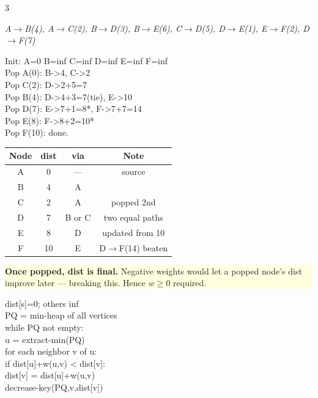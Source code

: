 \documentclass[9pt]{extarticle}
\newcommand{\yb}[1]{\vspace{1pt}\noindent\colorbox{lightyellow}{\parbox{\dimexpr\linewidth-2\fboxsep}{\footnotesize\sffamily #1}}\vspace{1pt}}
\newcommand{\cd}[1]{{\fontsize{7}{8.5}\selectfont\ttfamily\noindent #1}}
\begin{document}
\vspace{2pt}
\begin{multicols}{3}

\begin{tcolorbox}[teal,title=Dijkstra on Master Graph (source $A$)]
\small
\textit{A$\to$B(4), A$\to$C(2), B$\to$D(3), B$\to$E(6), C$\to$D(5), D$\to$E(1), E$\to$F(2), D$\to$F(7)}

\cd{Init: A=0 B=inf C=inf D=inf E=inf F=inf\\
Pop A(0): B->4, C->2\\
Pop C(2): D->2+5=7\\
Pop B(4): D->4+3=7(tie), E->10\\
Pop D(7): E->7+1=8*, F->7+7=14\\
Pop E(8): F->8+2=10*\\
Pop F(10): done.}

\begin{center}\scriptsize
\begin{tabular}{@{}cccc@{}}
\toprule Node&dist&via&Note\\\midrule
A&0&---&source\\
B&4&A&\\
C&2&A&popped 2nd\\
D&7&B or C&two equal paths\\
E&8&D&updated from 10\\
F&10&E&D$\to$F(14) beaten\\\bottomrule
\end{tabular}
\end{center}
\yb{\textbf{Once popped, dist is final.} Negative weights would let a popped node's dist improve later --- breaking this. Hence $w\geq 0$ required.}
\end{tcolorbox}

\vspace{3pt}
\begin{tcolorbox}[teal,title=Dijkstra --- Algorithm \& Runtimes]
\small
\cd{dist[s]=0; others inf\\
PQ = min-heap of all vertices\\
while PQ not empty:\\
\quad u = extract-min(PQ)\\
\quad for each neighbor v of u:\\
\quad\quad if dist[u]+w(u,v) < dist[v]:\\
\quad\quad\quad dist[v] = dist[u]+w(u,v)\\
\quad\quad\quad decrease-key(PQ,v,dist[v])}


\end{tcolorbox}
\end{multicols}
\end{document}
